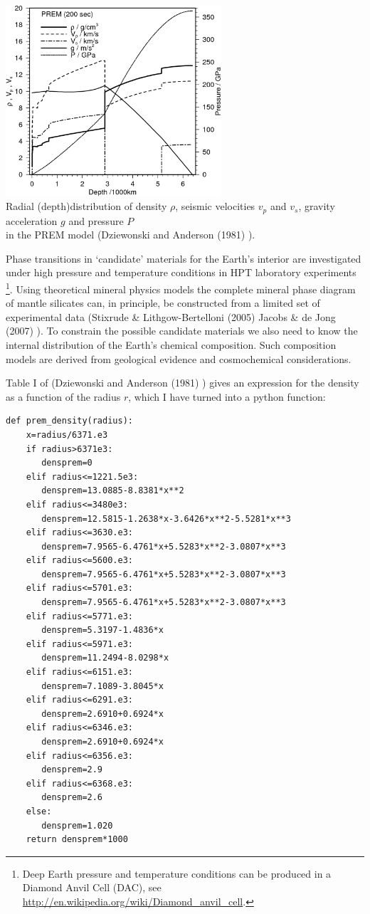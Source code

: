 \begin{center}
\includegraphics[width=8cm]{images/gravity/PREM-inc-pressure}\\
{\captionfont Radial (depth)distribution of density $\rho$, 
seismic velocities $v_p$ and $v_s$,
gravity acceleration $g$ and pressure $P$ \\
in the PREM model (Dziewonski and Anderson (1981) \cite{dzan81}).}
\end{center}


Phase transitions in `candidate' materials for the Earth's interior
are investigated under high pressure and temperature conditions in
HPT laboratory experiments
\footnote{
Deep Earth pressure and temperature conditions can be produced in 
a Diamond Anvil Cell (DAC),
see \url{http://en.wikipedia.org/wiki/Diamond\_anvil\_cell}.
}.
Using theoretical mineral physics models the complete mineral phase 
diagram of mantle silicates can, in principle,
be constructed from a limited set of experimental data
(Stixrude \& Lithgow-Bertelloni (2005) \cite{stli05,stli05b}
Jacobs \& de Jong (2007) \cite{jade07}).  
To constrain the possible candidate materials we also need to know 
the internal distribution of the Earth's chemical composition.
Such composition models are derived from geological evidence and
cosmochemical considerations.

Table I of (Dziewonski and Anderson (1981) \cite{dzan81}) gives 
an expression for the density as a function of the radius $r$, which 
I have turned into a python function:
\begin{lstlisting}
def prem_density(radius):
    x=radius/6371.e3
    if radius>6371e3:
       densprem=0
    elif radius<=1221.5e3:
       densprem=13.0885-8.8381*x**2
    elif radius<=3480e3:
       densprem=12.5815-1.2638*x-3.6426*x**2-5.5281*x**3
    elif radius<=3630.e3:
       densprem=7.9565-6.4761*x+5.5283*x**2-3.0807*x**3
    elif radius<=5600.e3:
       densprem=7.9565-6.4761*x+5.5283*x**2-3.0807*x**3
    elif radius<=5701.e3:
       densprem=7.9565-6.4761*x+5.5283*x**2-3.0807*x**3
    elif radius<=5771.e3:
       densprem=5.3197-1.4836*x
    elif radius<=5971.e3:
       densprem=11.2494-8.0298*x
    elif radius<=6151.e3:
       densprem=7.1089-3.8045*x
    elif radius<=6291.e3:
       densprem=2.6910+0.6924*x
    elif radius<=6346.e3:
       densprem=2.6910+0.6924*x
    elif radius<=6356.e3:
       densprem=2.9
    elif radius<=6368.e3:
       densprem=2.6
    else:
       densprem=1.020
    return densprem*1000
\end{lstlisting}


